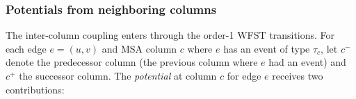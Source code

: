 % 
% 
% 

\subsubsection{Potentials from neighboring columns}

The inter-column coupling enters through the order-1 WFST transitions.
For each edge $e = (u,v)$ and MSA column $c$ where $e$ has an event of type $\tau_c$,
let $c^-$ denote the predecessor column (the previous column where $e$ had an event)
and $c^+$ the successor column.
The \emph{potential} at column $c$ for edge $e$ receives two contributions:

